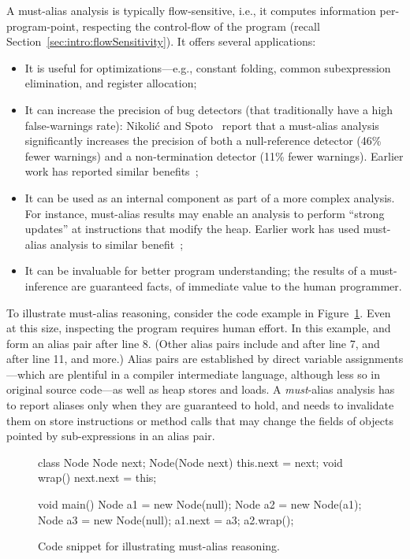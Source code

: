 A must-alias analysis is typically flow-sensitive, i.e., it computes information per-program-point, respecting the control-flow of the program (recall Section~\ref{sec:intro:flowSensitivity}). It offers several applications:

\begin{itemize}
\item It is useful for optimizations---e.g., constant folding, common subexpression elimination, and register allocation;

\item It can increase the precision of bug detectors (that traditionally have a high false-warnings rate): Nikoli\'{c} and Spoto~\cite{ictac:2012:Nikolic} report that a must-alias analysis significantly increases the precision of both a null-reference detector (46\% fewer warnings) and a non-termination detector (11\% fewer warnings). Earlier work has reported similar benefits~\cite{isola:2008:Ma};

\item It can be used as an internal component as part of a more complex analysis. For instance, must-alias results may enable an analysis to perform ``strong updates'' at instructions that modify the heap. Earlier work has used must-alias analysis to similar benefit~\cite{pldi:1994:Emami,popl:1998:Jagannathan};

\item It can be invaluable for better program understanding; the results of a must-inference are guaranteed facts, of immediate value to the human programmer.
\end{itemize}

To illustrate must-alias reasoning, consider the code example in Figure~\ref{fig:must-logic:snippet}. Even at this size, inspecting the program requires human effort. In this example,  and  form an alias pair after line 8. (Other alias pairs include  and  after line 7,  and  after line 11, and more.) Alias pairs are established by direct variable assignments---which are plentiful in a compiler intermediate language, although less so in original source code---as well as heap stores and loads. A \emph{must}-alias analysis has to report aliases only when they are guaranteed to hold, and needs to invalidate them on store instructions or method calls that may change the fields of objects pointed by sub-expressions in an alias pair.

\begin{figure}[htb!p]
\begin{javacode}
class Node {
	Node next;
	Node(Node next) { this.next = next; }
	void wrap() { next.next = this; }
}

void main() {
	Node a1 = new Node(null);
	Node a2 = new Node(a1);
	Node a3 = new Node(null);
	a1.next = a3;
	a2.wrap();
}
\end{javacode}
\caption{Code snippet for illustrating must-alias reasoning.}
\label{fig:must-logic:snippet}
\end{figure}


